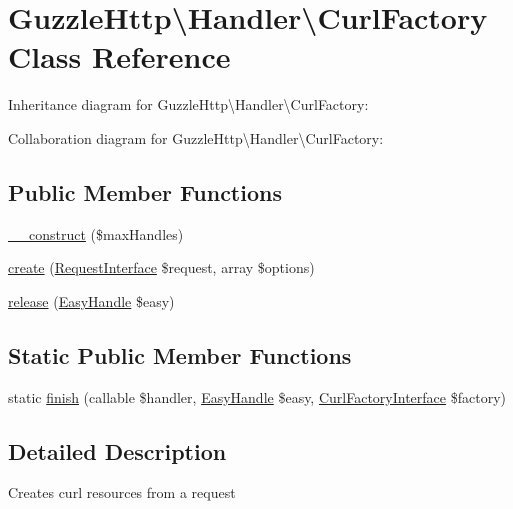 \hypertarget{classGuzzleHttp_1_1Handler_1_1CurlFactory}{}\section{Guzzle\+Http\textbackslash{}Handler\textbackslash{}Curl\+Factory Class Reference}
\label{classGuzzleHttp_1_1Handler_1_1CurlFactory}


Inheritance diagram for Guzzle\+Http\textbackslash{}Handler\textbackslash{}Curl\+Factory\+:


Collaboration diagram for Guzzle\+Http\textbackslash{}Handler\textbackslash{}Curl\+Factory\+:
\subsection*{Public Member Functions}
\begin{DoxyCompactItemize}
\item 
\hyperlink{classGuzzleHttp_1_1Handler_1_1CurlFactory_aba5541f33e74d0ee53cf7b8e9ba402f3}{\+\_\+\+\_\+construct} (\$max\+Handles)
\item 
\hyperlink{classGuzzleHttp_1_1Handler_1_1CurlFactory_af3ad5606ce3270d876bcc99bebbf0723}{create} (\hyperlink{interfacePsr_1_1Http_1_1Message_1_1RequestInterface}{Request\+Interface} \$request, array \$options)
\item 
\hyperlink{classGuzzleHttp_1_1Handler_1_1CurlFactory_a6a02be02e448028d8af9a3ee7190f857}{release} (\hyperlink{classGuzzleHttp_1_1Handler_1_1EasyHandle}{Easy\+Handle} \$easy)
\end{DoxyCompactItemize}
\subsection*{Static Public Member Functions}
\begin{DoxyCompactItemize}
\item 
static \hyperlink{classGuzzleHttp_1_1Handler_1_1CurlFactory_ad0e3533088e99efd1f0dc6175492e92f}{finish} (callable \$handler, \hyperlink{classGuzzleHttp_1_1Handler_1_1EasyHandle}{Easy\+Handle} \$easy, \hyperlink{interfaceGuzzleHttp_1_1Handler_1_1CurlFactoryInterface}{Curl\+Factory\+Interface} \$factory)
\end{DoxyCompactItemize}


\subsection{Detailed Description}
Creates curl resources from a request 

